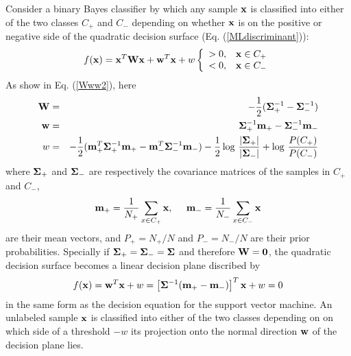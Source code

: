 \documentclass{article}
\begin{document}
Consider a binary Bayes classifier by which any sample ${\bf x}$ is 
classified into either of the two classes $C_+$ and $C_-$ depending on
whether ${\bf x}$ is on the positive or negative side of the quadratic
decision surface (Eq. (\ref{MLdiscriminant})):
\begin{equation}
  f({\bf x})={\bf x}^T{\bf W}{\bf x}+{\bf w}^T{\bf x}+w
  \left\{\begin{array}{ll}>0, & {\bf x}\in C_+\\<0, &
      {\bf x}\in C_-\end{array}
  \right.
\end{equation}
As show in Eq. (\ref{Www2}), here
\begin{eqnarray}
  {\bf W}&=&-\frac{1}{2}({\bf \Sigma}_+^{-1}-{\bf \Sigma}_-^{-1})	
  \nonumber\\
  {\bf w}&=&{\bf \Sigma}_+^{-1}{\bf m}_+-{\bf \Sigma}_-^{-1}{\bf m}_-
  \nonumber\\	
  w&=&-\frac{1}{2}({\bf m}_+^T{\bf \Sigma}_+^{-1}{\bf m}_+
  -{\bf m}_-^T{\bf \Sigma}_-^{-1}{\bf m}_-)
  -\frac{1}{2}\log\,\frac{|{\bf \Sigma}_+|}{|{\bf \Sigma}_-|}
  +\log\,\frac{P(C_+)}{P(C_-)}
\end{eqnarray}
where ${\bf\Sigma}_+$ and ${\bf\Sigma}_-$ are respectively the 
covariance matrices of the samples in $C_+$ and $C_-$,
\begin{equation}
  {\bf m}_+=\frac{1}{N_+}\sum_{x\in C_+}{\bf x},\;\;\;\;\;
  {\bf m}_-=\frac{1}{N_-}\sum_{x\in C_-}{\bf x}
\end{equation}
are their mean vectors, and $P_+=N_+/N$ and $P_-=N_-/N$ are their prior
probabilities. Specially if ${\bf\Sigma}_+={\bf\Sigma}_-={\bf\Sigma}$ 
and therefore ${\bf W}={\bf 0}$, the quadratic decision surface becomes 
a linear decision plane discribed by 
\begin{equation}
  f({\bf x})={\bf w}^T{\bf x}+w
  =\left[{\bf\Sigma}^{-1}({\bf m}_+-{\bf m}_-)\right]^T{\bf x}+w=0
\end{equation}
in the same form as the decision equation for the support vector machine.
An unlabeled sample ${\bf x}$ is classified into either of the two classes 
depending on on which side of a threshold $-w$ its projection onto the 
normal direction ${\bf w}$ of the decision plane lies.
\end{document}
